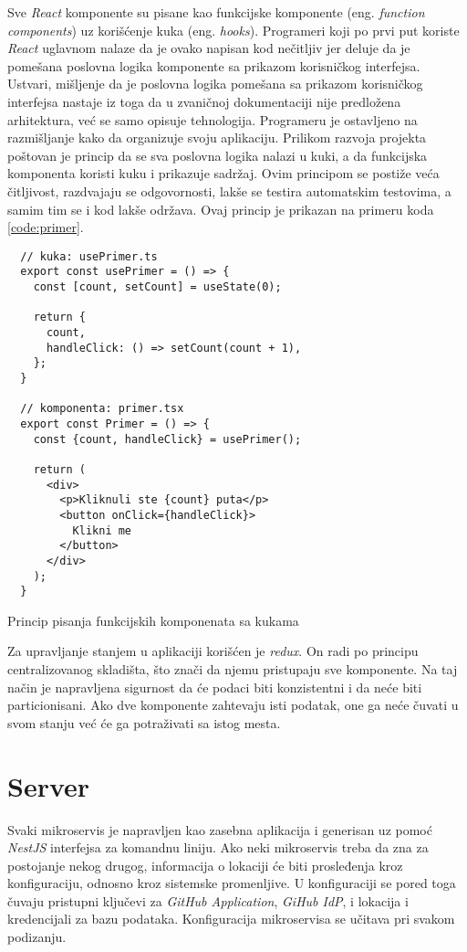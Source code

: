 Sve \textit{React} komponente su pisane kao funkcijske komponente 
(eng. \textit{function components}) uz korišćenje kuka (eng. \textit{hooks}).
Programeri koji po prvi put koriste \textit{React} uglavnom nalaze da je 
ovako napisan kod nečitljiv jer deluje da je pomešana poslovna logika komponente 
sa prikazom korisničkog interfejsa. Ustvari, mišljenje da je poslovna logika 
pomešana sa prikazom korisničkog interfejsa nastaje iz toga da u zvaničnoj 
dokumentaciji nije predložena arhitektura, već se samo opisuje tehnologija.
Programeru je ostavljeno na razmišljanje kako da organizuje svoju aplikaciju.
Prilikom razvoja projekta poštovan je princip da se sva poslovna logika 
nalazi u kuki, a da funkcijska komponenta koristi kuku i prikazuje sadržaj. 
Ovim principom se postiže veća čitljivost, razdvajaju se odgovornosti, lakše se testira 
automatskim testovima, a samim tim se i kod lakše održava. 
Ovaj princip je prikazan na primeru koda \ref{code:primer}.

\begin{listing}[h]
  \centering
  \begin{verbatim}
  // kuka: usePrimer.ts 
  export const usePrimer = () => {
    const [count, setCount] = useState(0);

    return {
      count,
      handleClick: () => setCount(count + 1),
    };
  }

  // komponenta: primer.tsx 
  export const Primer = () => {
    const {count, handleClick} = usePrimer();

    return (
      <div>
        <p>Kliknuli ste {count} puta</p>
        <button onClick={handleClick}>
          Klikni me
        </button>
      </div>
    );
  }
  \end{verbatim}
\caption{Princip pisanja funkcijskih komponenata sa kukama}
\label{code:primer}
\end{listing}

Za upravljanje stanjem u aplikaciji korišćen je \textit{redux}. On radi 
po principu centralizovanog skladišta, što znači da njemu pristupaju sve 
komponente. Na taj način je napravljena sigurnost da će podaci biti konzistentni 
i da neće biti particionisani. Ako dve komponente zahtevaju isti podatak, one ga neće čuvati u svom stanju 
već će ga potraživati sa istog mesta.

\section{Server}
Svaki mikroservis je napravljen kao zasebna aplikacija i generisan uz pomoć 
\textit{NestJS} interfejsa za komandnu liniju. Ako neki mikroservis treba 
da zna za postojanje nekog drugog, informacija o lokaciji će biti prosleđenja 
kroz konfiguraciju, odnosno kroz sistemske promenljive. U konfiguraciji 
se pored toga čuvaju pristupni ključevi za \textit{GitHub Application}, 
\textit{GiHub IdP}, i lokacija i kredencijali za bazu podataka. Konfiguracija 
mikroservisa se učitava pri svakom podizanju.

